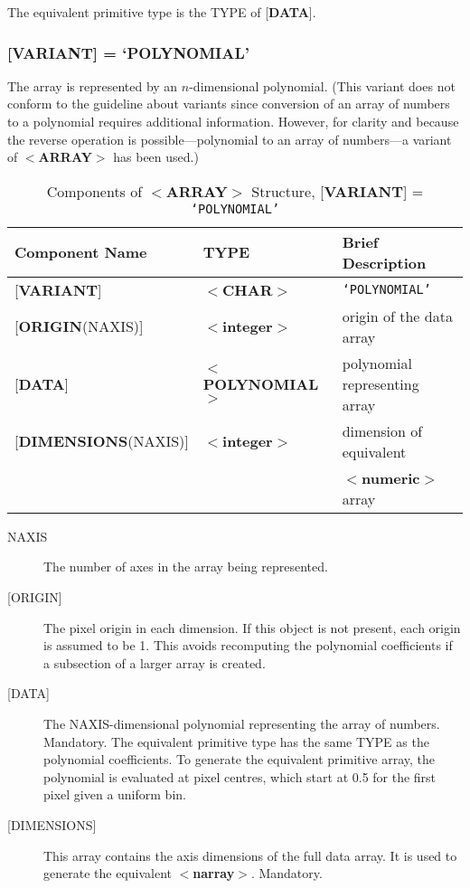 \documentclass[twoside,11pt]{article}
\renewcommand{\_}{\texttt{\symbol{95}}}
\begin{document}
The equivalent primitive type is the TYPE of {[}{\bf DATA}{]}.

\subsubsection{{[}{\bf VARIANT}{]} = `POLYNOMIAL'}
The array is represented by an $n$-dimensional
polynomial.
(This variant does not conform to the 
guideline about variants since conversion of an array of numbers to a
polynomial requires additional information.  However, for clarity and
because the reverse operation is possible---polynomial to an array of
numbers---a variant of $<${\bf ARRAY}$>$ has been used.)

\begin{table}[htb]
\centering
\caption{Components of $<${\bf ARRAY}$>$ Structure, {[}{\bf VARIANT}{]} = {\tt `POLYNOMIAL'}}
\begin{tabular}{|l|l|l|}
\hline
Component Name & TYPE & Brief Description \\ \hline
{[}{\bf VARIANT}{]} & $<${\bf \_CHAR}$>$ & {\tt `POLYNOMIAL'} \\
{[}{\bf ORIGIN}(NAXIS){]} & $<${\bf integer}$>$ & origin of the data array \\
{[}{\bf DATA}{]} & $<${\bf POLYNOMIAL}$>$ & polynomial representing array \\
{[}{\bf DIMENSIONS}(NAXIS){]} & $<${\bf integer}$>$ & dimension of equivalent \\
& & $<${\bf numeric}$>$ array \\ \hline
\end{tabular}
\end{table}

\begin{description}
\item [NAXIS]
The number of axes in the array being represented.
\item [{[}ORIGIN{]}]
The pixel origin in each dimension.  If this object is not present,
each origin is assumed to be 1.  This avoids recomputing the 
polynomial coefficients if a subsection of a larger array is created.
\item [{[}DATA{]}]
The NAXIS-dimensional polynomial representing the array of numbers.
Mandatory.  The equivalent primitive type has the same TYPE as
the polynomial coefficients. To generate the equivalent primitive
array, the polynomial is evaluated at pixel centres, which start
at 0.5 for the first pixel given a uniform bin.
\item [{[}DIMENSIONS{]}]
This array contains the axis dimensions of the full data array.
It is used to generate the equivalent $<${\bf narray}$>$.
Mandatory.
\end{description}
\end{document}
